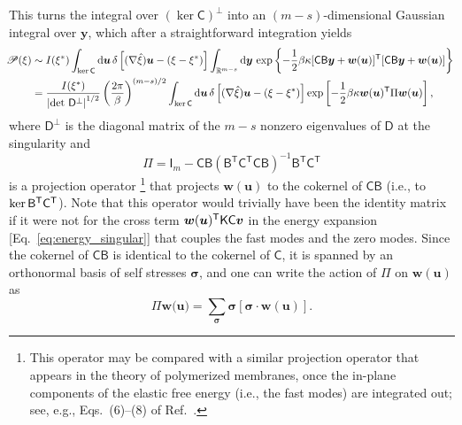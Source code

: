 This turns the integral over $(\ker\mathsf{C})^{\perp}$ into an $(m-s)$-dimensional Gaussian integral over $\bm{y}$, which after a straightforward integration yields
%
\begin{equation}
  \hspace{-0.5em}
  \begin{aligned}
    \mathscr{P}(\xi) &\sim I(\xi^{*}) \int_{\ker\mathsf{C}} \mathrm{d}\bm{u}\, \delta\left[(\nabla\hat{\xi})\bm{u} - (\xi - \xi^{*})\right] \int_{\mathbb{R}^{m-s}} \mathrm{d}\bm{y}\, \exp\left\{-\frac{1}{2}\beta\kappa[\mathsf{C}\mathsf{B}\bm{y} + \bm{w}(\bm{u})]^\mathsf{T}[\mathsf{C}\mathsf{B}\bm{y} + \bm{w}(\bm{u})]\right\}\\
                                             &= \frac{I(\xi^{*})}{\left|\det\, \mathsf{D}^\perp\right|^{1/2}} \left(\frac{2\pi}{\beta}\right)^{(m-s)/2} \int_{\ker\mathsf{C}} \mathrm{d}\bm{u}\, \delta\left[(\nabla\hat{\xi})\bm{u} - (\xi - \xi^{*})\right] \exp\left[-\frac{1}{2}\beta\kappa \bm{w}(\bm{u})^\mathsf{T}\Pi \bm{w}(\bm{u})\right],
  \end{aligned}
  \label{eq:mpd_gaussian}
\end{equation}
%
where $\mathsf{D}^\perp$ is the diagonal matrix of the $m - s$ nonzero eigenvalues of $\mathsf{D}$ at the singularity and
%
\begin{equation}
  \Pi = \mathsf{I}_{m} - \mathsf{C}\mathsf{B} (\mathsf{B} ^\mathsf{T}\mathsf{C}^\mathsf{T}\mathsf{C}\mathsf{B} )^{-1}\mathsf{B} ^\mathsf{T}\mathsf{C}^\mathsf{T}
\end{equation}
%
is a projection operator%
\footnote{This operator may be compared with a similar projection operator that appears in the theory of polymerized membranes, once the in-plane components of the elastic free energy (i.e., the fast modes) are integrated out; see, e.g., Eqs.~(6)--(8) of Ref.~\cite{nelson1987}.}
that projects $\bm{w}(\bm{u})$ to the cokernel of $\mathsf{C}\mathsf{B}$ (i.e., to $\ker\mathsf{B}^\mathsf{T}\mathsf{C}^\mathsf{T}$).
Note that this operator would trivially have been the identity matrix if it were not for the cross term $\bm{w}(\bm{u})^\mathsf{T}\mathsf{K}\mathsf{C}\bm{v}$ in the energy expansion [Eq.~\eqref{eq:energy_singular}] that couples the fast modes and the zero modes.
Since the cokernel of $\mathsf{CB}$ is identical to the cokernel of $\mathsf{C}$, it is spanned by an orthonormal basis of self stresses $\bm{\sigma}$, and one can write the action of $\Pi$ on $\bm{w}(\bm{u})$ as
%
\begin{equation}
  \Pi \bm{w}(\bm{u)} = \sum_{\bm{\sigma}} \bm{\sigma}[\bm{\sigma}\cdot\bm{w}(\bm{u})].
  \label{eq:mpd_proj}
\end{equation}
